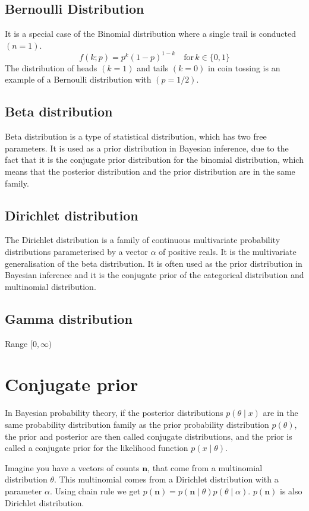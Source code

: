 \documentclass{book}
\begin{document}
\subsection{Bernoulli Distribution}
It is a special case of the Binomial distribution where a single trail is conducted $(n=1)$.
\[f(k;p) = p^k(1-p)^{1-k} \quad \text{for} \, k \in \{0,1\}\]
The distribution of heads $(k=1)$ and tails $(k=0)$ in coin tossing is an example of a Bernoulli distribution with $(p=1/2)$.

\subsection{Beta distribution}
Beta distribution is a type of statistical distribution, which has two free parameters. It is used as a prior distribution in Bayesian inference, due to the fact that it is the conjugate prior distribution for the binomial distribution, which means that the posterior distribution and the prior distribution are in the same family.

\subsection{Dirichlet distribution}
The Dirichlet distribution is a family of continuous multivariate probability distributions parameterised by a vector $\alpha$ of positive reals. It is the multivariate generalisation of the beta distribution. It is often used as the prior distribution in Bayesian inference and it is the conjugate prior of the categorical distribution and multinomial distribution.

\subsection{Gamma distribution}
Range $[0,\infty)$


\section{Conjugate prior}
In Bayesian probability theory, if the posterior distributions $p(\theta \mid x)$ are in the same probability distribution family as the prior probability distribution $p(\theta)$, the prior and posterior are then called conjugate distributions, and the prior is called a conjugate prior for the likelihood function $p(x \mid \theta)$.

Imagine you have a vectors of counts $\mathbf{n}$, that come from a multinomial distribution $\theta$. This multinomial comes from a Dirichlet distribution with a parameter $\alpha$.
Using chain rule we get $p(\mathbf{n}) = p(\mathbf{n}\mid \theta)p(\theta \mid \alpha)$. $p(\mathbf{n})$ is also Dirichlet distribution.
\end{document}
